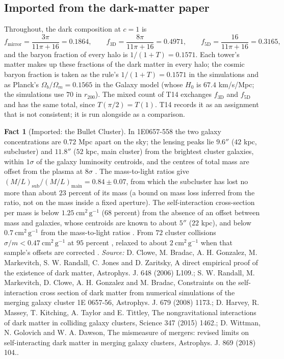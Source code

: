 \documentclass[11pt]{article}
\theoremstyle{definition}
\newtheorem{fact}[theorem]{Fact}
\theoremstyle{plain}
\providecommand{\cmg}{}\renewcommand{\cmg}{\mathrm{cm^{2}\,g^{-1}}}
\begin{document}
\subsection*{Imported from the dark-matter paper}
\label{c:note.simulations.setting-imported-dark-matter-paper}
Throughout, the dark composition at $c = 1$ is
\begin{equation}
f_{\mathrm{mirror}} = \frac{3\pi}{11\pi + 16} = 0.1864,\qquad
f_{3\mathrm{D}} = \frac{8\pi}{11\pi + 16} = 0.4971,\qquad
f_{5\mathrm{D}} = \frac{16}{11\pi + 16} = 0.3165,
\end{equation}
and the baryon fraction of every halo is $1/(1 + T) = 0.1571$. Each tower's matter makes up these fractions of the dark matter in every halo; the cosmic baryon fraction is taken as the rule's $1/(1 + T) = 0.1571$ in the simulations and as Planck's $\Omega_{b}/\Omega_{m} = 0.1565$ in the Galaxy model (whose $H_{0}$ is $67.4$ km/s/Mpc; the simulations use $70$ in $r_{200}$). The mixed count of T14 \cite[Rem.~7.10]{ButlerT14} exchanges $f_{3\mathrm{D}}$ and $f_{5\mathrm{D}}$ and has the same total, since $T(\pi/2) = T(1)$. T14 records it as an assignment that is not consistent; it is run alongside as a comparison.

\begin{fact}[Imported: the Bullet Cluster]\label{c:simulations.imported-bullet-cluster}
In 1E0657-558 the two galaxy concentrations are $0.72$ Mpc apart on the sky; the lensing peaks lie $9.6''$ ($42$ kpc, subcluster) and $11.8''$ ($52$ kpc, main cluster) from the brightest cluster galaxies, within $1\sigma$ of the galaxy luminosity centroids, and the centres of total mass are offset from the plasma at $8\sigma$ \cite{Clowe2006}. The mass-to-light ratios give $(M/L)_{\mathrm{sub}}/(M/L)_{\mathrm{main}} = 0.84 \pm 0.07$, from which the subcluster has lost no more than about $23$ percent of its mass (a bound on mass loss inferred from the ratio, not on the mass inside a fixed aperture). The self-interaction cross-section per mass is below $1.25\ \cmg$ ($68$ percent) from the absence of an offset between mass and galaxies, whose centroids are known to about $5''$ ($22$ kpc), and below $0.7\ \cmg$ from the mass-to-light ratios \cite{Randall2008}. From $72$ cluster collisions $\sigma/m < 0.47\ \cmg$ at $95$ percent \cite{Harvey2015}, relaxed to about $2\ \cmg$ when that sample's offsets are corrected \cite{Wittman2018}.
\emph{Source:} D. Clowe, M. Bradac, A. H. Gonzalez, M. Markevitch, S. W. Randall, C. Jones and D. Zaritsky, A direct empirical proof of the existence of dark matter, Astrophys. J. 648 (2006) L109.; S. W. Randall, M. Markevitch, D. Clowe, A. H. Gonzalez and M. Bradac, Constraints on the self-interaction cross section of dark matter from numerical simulations of the merging galaxy cluster 1E 0657-56, Astrophys. J. 679 (2008) 1173.; D. Harvey, R. Massey, T. Kitching, A. Taylor and E. Tittley, The nongravitational interactions of dark matter in colliding galaxy clusters, Science 347 (2015) 1462.; D. Wittman, N. Golovich and W. A. Dawson, The mismeasure of mergers: revised limits on self-interacting dark matter in merging galaxy clusters, Astrophys. J. 869 (2018) 104..
\end{fact}
\end{document}
